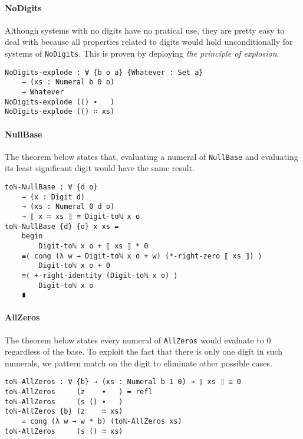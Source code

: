 \documentclass[\main/thesis.tex]{subfiles}
\begin{document}
\paragraph{NoDigits}

Although systems with no digits have no pratical use, they are pretty easy to deal
with because all properties related to digits would hold unconditionally for
systems of {\lstinline|NoDigits|}.
This is proven by deploying \textit{the principle of explosion}.

\begin{lstlisting}
NoDigits-explode : ∀ {b o a} {Whatever : Set a}
    → (xs : Numeral b 0 o)
    → Whatever
NoDigits-explode (() ∙   )
NoDigits-explode (() ∷ xs)
\end{lstlisting}

\paragraph{NullBase}

The theorem below states that, evaluating a numeral of {\lstinline|NullBase|}
and evaluating its least significant digit would have the same result.

\begin{lstlisting}
toℕ-NullBase : ∀ {d o}
    → (x : Digit d)
    → (xs : Numeral 0 d o)
    → ⟦ x ∷ xs ⟧ ≡ Digit-toℕ x o
toℕ-NullBase {d} {o} x xs =
    begin
        Digit-toℕ x o + ⟦ xs ⟧ * 0
    ≡⟨ cong (λ w → Digit-toℕ x o + w) (*-right-zero ⟦ xs ⟧) ⟩
        Digit-toℕ x o + 0
    ≡⟨ +-right-identity (Digit-toℕ x o) ⟩
        Digit-toℕ x o
    ∎
\end{lstlisting}

\paragraph{AllZeros}

The theorem below states every numeral of {\lstinline|AllZeros|}
would evaluate to $ 0 $ regardless of the base.
To exploit the fact that there is only one digit in such numerals, we pattern
match on the digit to eliminate other possible cases.

\begin{lstlisting}
toℕ-AllZeros : ∀ {b} → (xs : Numeral b 1 0) → ⟦ xs ⟧ ≡ 0
toℕ-AllZeros     (z    ∙   ) = refl
toℕ-AllZeros     (s () ∙   )
toℕ-AllZeros {b} (z    ∷ xs)
    = cong (λ w → w * b) (toℕ-AllZeros xs)
toℕ-AllZeros     (s () ∷ xs)
\end{lstlisting}








%
%
%
\end{document}

